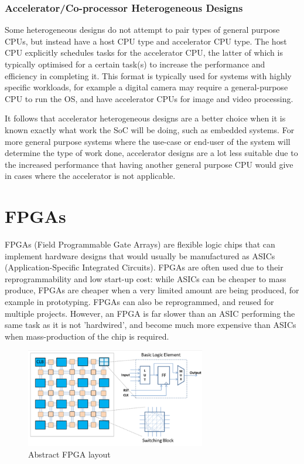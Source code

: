 \subsubsection{Accelerator/Co-processor Heterogeneous Designs}
Some heterogeneous designs do not attempt to pair types of general purpose CPUs, but instead have a host CPU type and accelerator CPU type. The host CPU explicitly schedules tasks for the accelerator CPU, the latter of which is typically optimised for a certain task(s) to increase the performance and efficiency in completing it. This format is typically used for systems with highly specific workloads, for example a digital camera may require a general-purpose CPU to run the OS, and have accelerator CPUs for image and video processing\cite[chapter~7]{digitaldesign}.

It follows that accelerator heterogeneous designs are a better choice when it is known exactly what work the SoC will be doing, such as embedded systems. For more general purpose systems where the use-case or end-user of the system will determine the type of work done, accelerator designs are a lot less suitable due to the increased performance that having another general purpose CPU would give in cases where the accelerator is not applicable.

\section{FPGAs}
FPGAs (Field Programmable Gate Arrays) are flexible logic chips that can implement hardware designs that would usually be manufactured as ASICs (Application-Specific Integrated Circuits). FPGAs are often used due to their reprogrammability and low start-up cost: while ASICs can be cheaper to mass produce, FPGAs are cheaper when a very limited amount are being produced, for example in prototyping. FPGAs can also be reprogrammed, and reused for multiple projects. However, an FPGA is far slower than an ASIC performing the same task as it is not 'hardwired', and become much more expensive than ASICs when mass-production of the chip is required\cite{fpga}.

\begin{figure}[H]
    \centering
    \includegraphics[width=0.7\textwidth]{img/ex_fpga.png}
    \caption{Abstract FPGA layout\cite{abs_fpga}}
    \label{fig:abs_fpga}
\end{figure}

